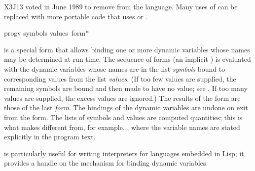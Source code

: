 \begin{newer}
X3J13 voted in June 1989  to remove
 from the language.  Many uses of 
can be replaced with more portable code that uses 
or .
\end{newer}

\goodbreak

\begin{defspec}
progv symbols values {\,form}*

 is a special form that allows binding one or more dynamic
variables whose names may be determined at run time.  The sequence of
forms (an implicit )
is evaluated with the dynamic variables whose names are in the list
\textit{symbols} bound to corresponding values from the list \textit{values}.
(If too few values are supplied, the remaining symbols are bound and then
made to have no value; see .  If too many values are
supplied, the excess values are ignored.)  The results of the 
form are those of the last
\textit{form}.  The bindings of the dynamic variables are undone on
exit from the  form.  The lists of symbols and values are
computed quantities; this is what makes  different from, for
example, , where the variable names are stated explicitly in
the program text.

 is particularly useful for writing interpreters for languages
embedded in Lisp; it provides a handle on the mechanism for binding
dynamic variables.
\end{defspec}

